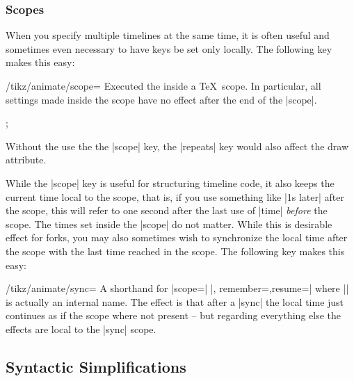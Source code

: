 \subsubsection{Scopes}
\label{section-anim-scopes}

When you specify multiple timelines at the same time, it is often
useful and sometimes even necessary to have keys be set only
locally. The following key makes this easy:

\begin{key}{/tikz/animate/scope=}
  Executed the  inside a \TeX\ scope. In particular, all
  settings made inside the scope have no effect after the end of the
  |scope|.  

\begin{codeexample}[animation list={0.5,1,1.5,2}]
\tikz {};
\end{codeexample}

  Without the use the the |scope| key, the |repeats| key would also
  affect the draw attribute. 
\end{key}

While the |scope| key is useful for structuring timeline code, it also
keeps the current time local to the scope, that is, if you use
something like |1s later| after the scope, this will refer to one
second after the last use of |time| \emph{before} the scope. The times
set inside the |scope| do not matter. While this is desirable effect
for forks, you may also sometimes wish to synchronize the local time
after the scope with the last time reached in the scope. The following
key makes this easy:

\begin{key}{/tikz/animate/sync=}
  A shorthand for |scope={| 
    |, remember=\temp},resume=\temp| where |\temp| is actually an
  internal name. The effect is that after a |sync| the local time just
  continues as if the scope where not present -- but regarding
  everything else the effects are local to the |sync| scope.
\end{key}




\subsection{Syntactic Simplifications}

